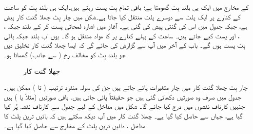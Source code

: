   کے مخارج میں ایک ہی بلند بِٹ گھومتا ہے؛ باقی تمام بِٹ پست رہتے ہیں۔ایک ہی بلند بِٹ کو ساعت کے کنارے پر ایک پلٹ سے دوسرے پلٹ منتقل کیا جاتا ہے۔شکل     میں چار بِٹ چھلا گنت کار پیش ہے، جبکہ جدول  میں اس کی گنتی پیش کی گئی ہے۔ آغاز  میں   اشارہ لمحاتی  پست کر کے  بلند جبکہ ، ، اور  پست کیے جاتے ہیں۔ ساعت کے پہلے کنارے پر   کا مواد  منتقل ہو گا۔ یوں اب  بلند جبکہ باقی بِٹ پست ہوں گے۔ باب کے آخر میں آپ سے گزارش کی جائے گی کہ ایسا  چھلا گنت کار تخلیق دیں جو بلند بِٹ کو مخالف رخ ( سے  جانب)  گھماتا ہو۔
%
\begin{figure}
\centering
{}
\caption{چھلا گنت کار}
\label{شکل_گنت_کار_چھلا}
\end{figure}
%
 چار بِٹ  چھلا گنت کار  میں چار  متغیرات    پائے جاتے ہیں جن کی  سولہ منفرد ترتیب  ( تا ) ممکن ہیں۔جدول   میں صرف وہ   صورتیں دکھائی گئی ہیں جو حقیقتاً پائی جاتی ہیں. باقی صورتیں (مثلاً  یا )  ہیں جنہیں کارناف نقشوں میں  درج کیا جائے گا۔  شکل  میں مداخل  کے لیے  جدول سے کارناف نقشہ پُر کیا گیا ہے، جہاں سے  حاصل کیا گیا ہے۔ چھلا گنت کار میں آپ دیکھ سکتے ہیں کہ بائیں ترین پلٹ کا مداخل ، دائیں ترین پلٹ کے مخارج  سے حاصل کیا گیا ہے۔

